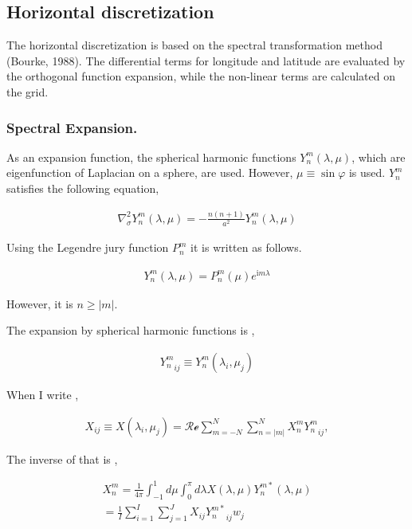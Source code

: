 \hypertarget{horizontal-discretization}{%
\subsection{Horizontal discretization}\label{horizontal-discretization}}

The horizontal discretization is based on the spectral transformation
method (Bourke, 1988). The differential terms for longitude and latitude
are evaluated by the orthogonal function expansion, while the non-linear
terms are calculated on the grid.

\hypertarget{spectral-expansion.}{%
\subsubsection{Spectral Expansion.}\label{spectral-expansion.}}

As an expansion function, the spherical harmonic functions
\(Y_n^m(\lambda,\mu)\), which are eigenfunction of Laplacian on a
sphere, are used. However, \(\mu \equiv \sin\varphi\) is used. \(Y_n^m\)
satisfies the following equation,

\begin{eqnarray}
\nabla^{2}_{\sigma} Y_n^m(\lambda,\mu) 
= - \frac{n(n+1)}{a^{2}} Y_n^m(\lambda,\mu) 
\end{eqnarray}

Using the Legendre jury function \(P_n^m\) it is written as follows.

\begin{eqnarray}
Y_n^m(\lambda,\mu) = P_n^m (\mu) e^{\mathrm{i}m \lambda}
\end{eqnarray}

However, it is \(n \geq | m |\).

The expansion by spherical harmonic functions is ,

\begin{eqnarray}
   {Y_n^m}_{ij} \equiv Y_n^m ( \lambda_i, \mu_j )
\end{eqnarray}

When I write ,

\begin{eqnarray}
  X_{ij} \equiv X ( \lambda_i, \mu_j )
   =  \mathcal{Re} \sum_{m=-N}^{N} \sum_{n=|m|}^{N} 
        X_n^m {Y_n^m}_{ij} ,
\end{eqnarray}

The inverse of that is ,

\begin{eqnarray}
  X_n^m 
         =  \frac{1}{4 \pi} 
             \int_{-1}^{1} d \mu \int_{0}^{\pi} d \lambda 
               X( \lambda, \mu ) Y_n^{m *} ( \lambda, \mu ) \\
         =  \frac{1}{I} \sum_{i=1}^{I} \sum_{j=1}^{J}  
               X_{ij} {Y_n^{m*}}_{ij} w_j 
\end{eqnarray}

